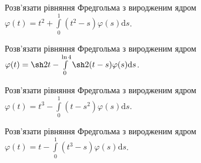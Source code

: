 \documentclass[12pt]{extarticle}
\begin{document}
\begin{Exercise}
Розв’язати рівняння Фредгольма з виродженим ядром $\varphi(t) = t^2 + \int\limits_{0}^{1} (t^2-s) \varphi(s) \mathrm{d}s$.
\end{Exercise}

\begin{Exercise}
Розв’язати рівняння Фредгольма з виродженим ядром $\varphi(t) = \sh 2t - \int\limits_{0}^{\ln 4} \sh 2(t-s) \varphi(s) \mathrm{d}s$.
\end{Exercise}

\begin{Exercise}
Розв’язати рівняння Фредгольма з виродженим ядром $\varphi(t) = t^3 - \int\limits_{0}^{1} (t-s^2) \varphi(s) \mathrm{d}s$.
\end{Exercise}

\begin{Exercise}
Розв’язати рівняння Фредгольма з виродженим ядром $\varphi(t) = t - \int\limits_{0}^{1} (t^3-s) \varphi(s) \mathrm{d}s$.
\end{Exercise}
\end{document}
